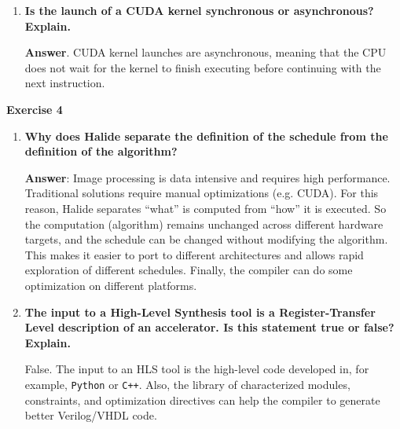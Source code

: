 \begin{enumerate}[label=\Alph*.]
    \item \textcolor{Green3}{\textbf{%
        Is the launch of a CUDA kernel synchronous or asynchronous? Explain.
    }}

    \textbf{Answer}. CUDA kernel launches are asynchronous, meaning that the CPU does not wait for the kernel to finish executing before continuing with the next instruction.
\end{enumerate}

\newpage

\begin{flushleft}
    \textcolor{Green3}{ \textbf{Exercise 4}}
\end{flushleft}
\begin{enumerate}[label=\Alph*.]
    \item \textcolor{Green3}{\textbf{%
        Why does Halide separate the definition of the schedule from the definition of the algorithm?
    }}

    \textbf{Answer}: Image processing is data intensive and requires high performance. Traditional solutions require manual optimizations (e.g. CUDA). For this reason, Halide separates ``what'' is computed from ``how'' it is executed. So the computation (algorithm) remains unchanged across different hardware targets, and the schedule can be changed without modifying the algorithm. This makes it easier to port to different architectures and allows rapid exploration of different schedules. Finally, the compiler can do some optimization on different platforms.

    \item \textcolor{Green3}{\textbf{%
        The input to a High-Level Synthesis tool is a Register-Transfer Level description of an accelerator. Is this statement true or false? Explain.
    }}

    False. The input to an HLS tool is the high-level code developed in, for example, \texttt{Python} or \texttt{C++}. Also, the library of characterized modules, constraints, and optimization directives can help the compiler to generate better Verilog/VHDL code.
\end{enumerate}